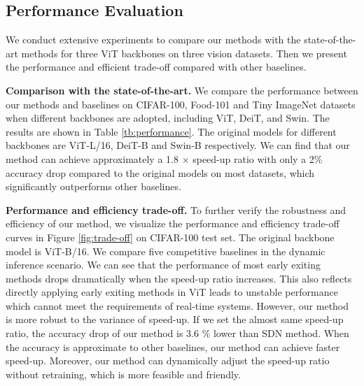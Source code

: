 \subsection{Performance Evaluation}
\label{sc:peformance}


We conduct extensive experiments to compare our methods with the state-of-the-art methods for three ViT backbones on three vision datasets. 
Then we present the performance and efficient trade-off compared with other baselines. 


\textbf{Comparison with the state-of-the-art.}
We compare the performance between our methods and baselines on CIFAR-100, Food-101 and Tiny ImageNet datasets when different backbones are adopted, including ViT, DeiT, and Swin.
The results are shown in Table \ref{tb:performance}. 
The original models for different backbones are ViT-L/16, DeiT-B and Swin-B respectively. 
We can find that our method can achieve approximately a 1.8 $\times$ speed-up ratio with only a 2\% accuracy drop compared to the original models on most datasets, 
which significantly outperforms other baselines. 

\textbf{Performance and efficiency trade-off. }
To further verify the robustness and efficiency of our method, we visualize the performance and efficiency trade-off curves in Figure \ref{fig:trade-off} on CIFAR-100 test set. 
The original backbone model is ViT-B/16. We compare five competitive baselines in the dynamic inference scenario. 
We can see that the performance of most early exiting methods drops dramatically when the speed-up ratio increases. 
This also reflects directly applying early exiting methods in ViT leads to unstable performance which cannot meet the requirements of real-time systems. 
However, our method is more robust to the variance of speed-up. 
If we set the almost same speed-up ratio, the accuracy drop of our method is 3.6 \% lower than SDN method. 
When the accuracy is approximate to other baselines, our method can achieve faster speed-up. 
Moreover, our method can dynamically adjust the speed-up ratio without retraining, which is more feasible and friendly. 

